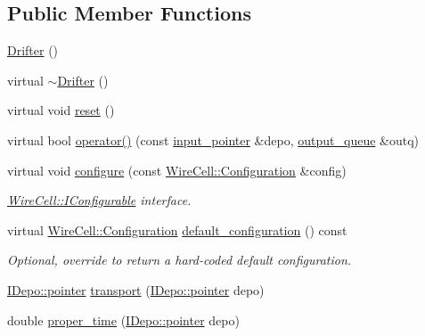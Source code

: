 \subsection*{Public Member Functions}
\begin{DoxyCompactItemize}
\item 
\hyperlink{class_wire_cell_1_1_gen_1_1_drifter_a26733fe40e2ed9bb562833312b466cc0}{Drifter} ()
\item 
virtual \hyperlink{class_wire_cell_1_1_gen_1_1_drifter_a8477d8f958696ba241c94708a8393cdf}{$\sim$\+Drifter} ()
\item 
virtual void \hyperlink{class_wire_cell_1_1_gen_1_1_drifter_a50935de34f9dd1171d76201b6081e9d7}{reset} ()
\item 
virtual bool \hyperlink{class_wire_cell_1_1_gen_1_1_drifter_aaac2664d52bd3ea47308e2760b256dab}{operator()} (const \hyperlink{class_wire_cell_1_1_i_queuedout_node_acf5f716a764553f3c7055a9cf67e906e}{input\+\_\+pointer} \&depo, \hyperlink{class_wire_cell_1_1_i_queuedout_node_a39018e4e3dd886befac9636ac791a685}{output\+\_\+queue} \&outq)
\item 
virtual void \hyperlink{class_wire_cell_1_1_gen_1_1_drifter_a3a4689030cd1223426682fefc0e85b35}{configure} (const \hyperlink{namespace_wire_cell_a9f705541fc1d46c608b3d32c182333ee}{Wire\+Cell\+::\+Configuration} \&config)
\begin{DoxyCompactList}\small\item\em \hyperlink{class_wire_cell_1_1_i_configurable}{Wire\+Cell\+::\+I\+Configurable} interface. \end{DoxyCompactList}\item 
virtual \hyperlink{namespace_wire_cell_a9f705541fc1d46c608b3d32c182333ee}{Wire\+Cell\+::\+Configuration} \hyperlink{class_wire_cell_1_1_gen_1_1_drifter_ac0a59fbb4c7da9c2f7711dc8a0b4ae48}{default\+\_\+configuration} () const
\begin{DoxyCompactList}\small\item\em Optional, override to return a hard-\/coded default configuration. \end{DoxyCompactList}\item 
\hyperlink{class_wire_cell_1_1_i_data_aff870b3ae8333cf9265941eef62498bc}{I\+Depo\+::pointer} \hyperlink{class_wire_cell_1_1_gen_1_1_drifter_a15c92059fc878922af5bbede346ff04f}{transport} (\hyperlink{class_wire_cell_1_1_i_data_aff870b3ae8333cf9265941eef62498bc}{I\+Depo\+::pointer} depo)
\item 
double \hyperlink{class_wire_cell_1_1_gen_1_1_drifter_a28657b21ffae9ef73622c60216fc2f59}{proper\+\_\+time} (\hyperlink{class_wire_cell_1_1_i_data_aff870b3ae8333cf9265941eef62498bc}{I\+Depo\+::pointer} depo)

\end{DoxyCompactItemize}
